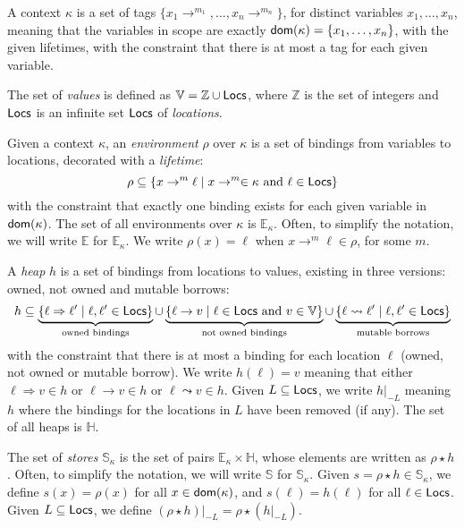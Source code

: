 \begin{definition}[Context]\label{def:context}
  A context $\kappa$ is a set of tags $\{x_1\to^{m_1},\ldots,x_n\to^{m_n}\}$,
  for distinct variables $x_1,\ldots,x_n$,
  meaning that the variables in scope are exactly
  $\mathsf{dom}(\kappa)=\{x_1,\ldots,x_n\}$, with the given lifetimes,
  with the constraint that there is at most a tag for each
  given variable.
\end{definition}

\begin{definition}[Values]\label{def:values}
  The set of \emph{values} is defined as $\mathbb{V}=\mathbb{Z}\cup\mathsf{Locs}$,
  where $\mathbb{Z}$ is the set of integers and
  $\mathsf{Locs}$ is an infinite set $\mathsf{Locs}$ of \emph{locations}.
\end{definition}

\begin{definition}[Domains]\label{def:domains}
  Given a context $\kappa$, an \emph{environment} $\rho$ over $\kappa$
  is a set of bindings from variables to locations, decorated with a \emph{lifetime}:
  \[
  \rho\subseteq\{x\to^m\ell\mid x\to^m\in\kappa\text{ and }\ell\in\mathsf{Locs}\}
  \]
  with the constraint that exactly one binding exists for each given variable in $\mathsf{dom}(\kappa)$.
  The set of all environments over $\kappa$ is $\mathbb{E}_\kappa$.
  Often, to simplify the notation, we will write $\mathbb{E}$ for $\mathbb{E}_\kappa$.
  We write $\rho(x)=\ell$ when $x\rightarrow^m\ell\in\rho$, for some $m$.  

  A \emph{heap} $h$ is a set of bindings from locations to values,
  existing in three versions: owned, not owned and mutable borrows:
  \[
  h\subseteq
  \underbrace{\{\ell\Rightarrow\ell'\mid\ell,\ell'\in\mathsf{Locs}\}}_{\text{owned bindings}}
  \cup
  \underbrace{\{\ell\rightarrow v\mid\ell\in\mathsf{Locs}\text{ and }v\in\mathbb{V}\}}_{\text{not owned bindings}}
  \cup
  \underbrace{\{\ell\leadsto\ell'\mid\ell,\ell'\in\mathsf{Locs}\}}_{\text{mutable borrows}}
  \]
  with the constraint that there is at most a binding for each
  location $\ell$ (owned, not owned or mutable borrow). We write $h(\ell)=v$ meaning that
  either $\ell\Rightarrow v\in h$ or $\ell\rightarrow v\in h$ or $\ell\leadsto v\in h$.
  Given $L\subseteq\mathsf{Locs}$,
  we write $h|_{-L}$ meaning $h$ where the bindings for the locations in $L$
  have been removed (if any).
  The set of all heaps is $\mathbb{H}$.

  The set of \emph{stores} $\mathbb{S}_\kappa$ is the set of pairs
  $\mathbb{E}_\kappa\times\mathbb{H}$, whose elements are written as $\rho\star h$.
  Often, to simplify the notation, we will write $\mathbb{S}$ for $\mathbb{S}_\kappa$.
  Given $s=\rho\star h\in\mathbb{S}_\kappa$, we define $s(x)=\rho(x)$ for all
  $x\in\mathsf{dom}(\kappa)$, and $s(\ell)=h(\ell)$ for all $\ell\in\mathsf{Locs}$.
  Given $L\subseteq\mathsf{Locs}$, we define $(\rho\star h)|_{-L}=\rho\star(h|_{-L})$.
\end{definition}

